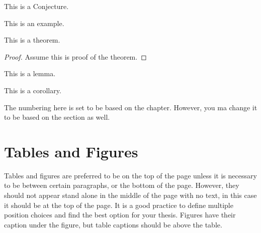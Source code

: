 \begin{conjecture}
This is a Conjecture.
\end{conjecture}

\begin{example}
This is an example.
\end{example}

\begin{theorem}
This is a theorem.
\end{theorem}
\begin{proof}
Assume this is proof of the theorem.
\end{proof}


\begin{lemma}
This is a lemma.
\end{lemma}

\begin{corollary}
This is a corollary.
\end{corollary}

The numbering here is set to be based on the chapter. However, you ma change it to be based on the section as well.

\section{Tables and Figures}\label{sec:tablesandfigures}
Tables and figures are preferred to be on the top of the page unless it is necessary to be between certain paragraphs, or the bottom of the page. However, they should not appear stand alone in the middle of the page with no text, in this case it should be at the top of the page. It is a good practice to define multiple position choices and find the best option for your thesis. Figures have their caption under the figure, but table captions should be above the table.

